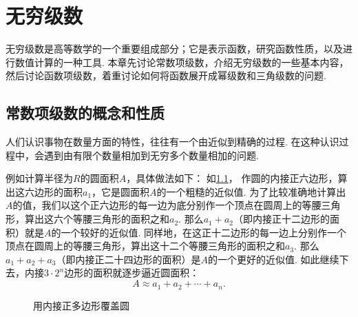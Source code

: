 \begingroup
\def\s{\sum\limits_{i=1}^\infty }
\renewcommand{\s}[1][1]{\sum\limits_{i=#1}^\infty }%
\def\sn{\sum\limits_{i=1}^n}
\def\l{\lim\limits_{n\to\infty}}
\def\tint{\int_{-\pi}^{\pi}}

\chapter{无穷级数}
无穷级数是高等数学的一个重要组成部分；它是表示函数，研究函数性质，以及进行数值计算的一种工具.
本章先讨论常数项级数，介绍无穷级数的一些基本内容，然后讨论函数项级数，着重讨论如何将函数展开成幂级数和三角级数的问题.

\section{常数项级数的概念和性质}
人们认识事物在数量方面的特性，往往有一个由近似到精确的过程.
在这种认识过程中，会遇到由有限个数量相加到无穷多个数量相加的问题.

例如计算半径为\(R\)的圆面积\(A\)，具体做法如下：
如\cref{figure:无穷级数.用内接正多边形覆盖圆}，
作圆的内接正六边形，算出这六边形的面积\(a_1\)，它是圆面积\(A\)的一个粗糙的近似值.
为了比较准确地计算出\(A\)的值，我们以这个正六边形的每一边为底分别作一个顶点在圆周上的等腰三角形，算出这六个等腰三角形的面积之和\(a_2\).
那么\(a_1+a_2\)（即内接正十二边形的面积）就是\(A\)的一个较好的近似值.
同样地，在这正十二边形的每一边上分别作一个顶点在圆周上的等腰三角形，算出这十二个等腰三角形的面积之和\(a_3\).
那么\(a_1+a_2+a_3\)（即内接正二十四边形的面积）是\(A\)的一个更好的近似值.
如此继续下去，内接\(3\cdot2^n\)边形的面积就逐步逼近圆面积：\[
A \approx a_1 + a_2 + \dotsb + a_n.
\]

\begin{figure}[h]
	\centering
	\caption{用内接正多边形覆盖圆}
	\label{figure:无穷级数.用内接正多边形覆盖圆}
\end{figure}


